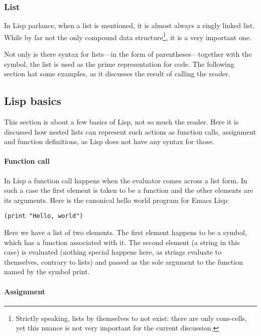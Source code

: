\documentclass[a4paper]{article}
\newcommand{\el}{Emacs Lisp}
\begin{document}
\subsubsection{List}
\label{subsubsec:list}

In Lisp parlance, when a list is mentioned, it is almost always a singly linked
list.  While by far not the only compound data structure\footnote{Strictly
  speaking, lists by themselves to not exist: there are only cons-cells, yet
  this nuance is not very important for the current discussion.}, it is a very
important one.

Not only is there syntax for lists---in the form of parentheses---together with
the symbol, the list is used as the prime representation for code.  The
following section hat some examples, as it discusses the result of calling the
reader.
\subsection{Lisp basics}
\label{subsec:lisp-basics}

This section is about a few basics of Lisp, not so much the reader.  Here it is
discussed how nested lists can represent such actions as function calls,
assignment and function definitions, as Lisp does not have any syntax for those.
\paragraph{Function call}
\label{par:function-call}

In Lisp a function call happens when the evaluator comes across a list form.  In
such a case the first element is taken to be a function and the other elements
are its arguments.  Here is the canonical hello world program for \el{}:

\begin{verbatim}
(print "Hello, world")
\end{verbatim}

Here we have a list of two elements.  The first element happens to be a symbol,
which has a function associated with it.  The second element (a string in this
case) is evaluated (nothing special happens here, as strings evaluate to
themselves, contrary to lists) and passed as the sole argument to the function
named by the symbol print.

\paragraph{Assignment}
\label{par:assignment}
\end{document}
